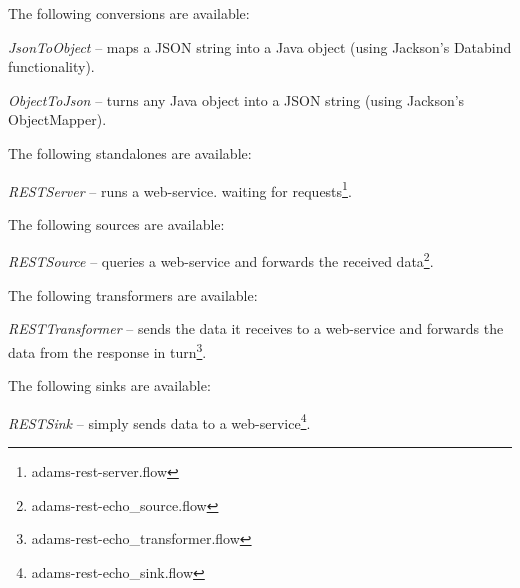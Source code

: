 \documentclass[a4paper]{book}
\begin{document}
The following conversions are available:
\begin{tight_itemize}
	\item \textit{JsonToObject} -- maps a JSON string into a Java object
	(using Jackson's Databind functionality\cite{jackson}).
	\item \textit{ObjectToJson} -- turns any Java object into a JSON string
	(using Jackson's ObjectMapper\cite{jackson}).
\end{tight_itemize}
The following standalones are available:
\begin{tight_itemize}
	\item \textit{RESTServer} -- runs a web-service. waiting for
	requests\footnote{adams-rest-server.flow}.
\end{tight_itemize}
The following sources are available:
\begin{tight_itemize}
	\item \textit{RESTSource} -- queries a web-service and forwards the received
	data\footnote{adams-rest-echo\_source.flow}.
\end{tight_itemize}
The following transformers are available:
\begin{tight_itemize}
	\item \textit{RESTTransformer} -- sends the data it receives to a web-service
	and forwards the data from the response in
	turn\footnote{adams-rest-echo\_transformer.flow}.
\end{tight_itemize}
The following sinks are available:
\begin{tight_itemize}
	\item \textit{RESTSink} -- simply sends data to a web-service\footnote{adams-rest-echo\_sink.flow}.
\end{tight_itemize}
\end{document}
